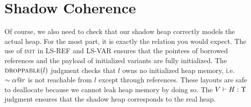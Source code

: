 \section*{Shadow Coherence}
Of course, we also need to check that our shadow heap correctly models
the actual heap. For the most part, it is exactly the relation you would expect.
The use of \textsc{init} in \textsc{LS-REF} and \textsc{LS-VAR} ensures that
the pointees of borrowed references and the payload of initialized variants
are fully initialized.
The $\textsc{droppable}(l)$ judgment checks that $l$ owns no initialized heap memory,
i.e. $\sim{{\alpha}@{r}}$ is not reachable from $l$ except through references.
These layouts are safe to deallocate because we cannot leak heap memory by doing so.
The ${V} \vdash {H} : {\Upsilon}$ judgment ensures that the shadow heap corresponds to the real heap.
\newline





